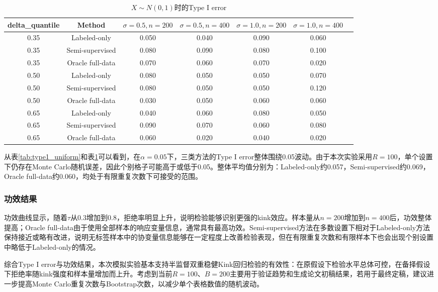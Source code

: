 \documentclass[12pt,a4paper]{ctexart}
\begin{document}
\begin{table}[htbp]
\centering
\caption{$X \sim N(0, 1)$时的Type I error}
\label{tab:type1_normal}
\small
\begin{tabular}{ccccccc}
\toprule
delta\_quantile & Method & $\sigma=0.5, n=200$ & $\sigma=0.5, n=400$ & $\sigma=1.0, n=200$ & $\sigma=1.0, n=400$ \\
\midrule
0.35 & Labeled-only & 0.050 & 0.040 & 0.090 & 0.060 \\
0.35 & Semi-supervised & 0.080 & 0.090 & 0.080 & 0.100 \\
0.35 & Oracle full-data & 0.070 & 0.060 & 0.070 & 0.020 \\
\midrule
0.50 & Labeled-only & 0.080 & 0.050 & 0.050 & 0.070 \\
0.50 & Semi-supervised & 0.080 & 0.050 & 0.050 & 0.120 \\
0.50 & Oracle full-data & 0.030 & 0.050 & 0.060 & 0.060 \\
\midrule
0.65 & Labeled-only & 0.040 & 0.060 & 0.080 & 0.050 \\
0.65 & Semi-supervised & 0.090 & 0.070 & 0.060 & 0.080 \\
0.65 & Oracle full-data & 0.060 & 0.020 & 0.040 & 0.020 \\
\bottomrule
\end{tabular}
\end{table}

从表\ref{tab:type1_uniform}和表\ref{tab:type1_normal}可以看到，在$\alpha=0.05$下，三类方法的Type I error整体围绕0.05波动。由于本次实验采用$R=100$，单个设置下仍存在Monte Carlo随机误差，因此个别格子可能高于或低于0.05。整体平均值分别为：Labeled-only约0.057，Semi-supervised约0.069，Oracle full-data约0.060，均处于有限重复次数下可接受的范围。

\subsubsection{功效结果}

功效曲线显示，随着$\tau$从0.3增加到0.8，拒绝率明显上升，说明检验能够识别更强的kink效应。样本量从$n=200$增加到$n=400$后，功效整体提高；Oracle full-data由于使用全部样本的响应变量信息，通常具有最高功效。Semi-supervised方法在多数设置下相对于Labeled-only方法保持接近或略有改进，说明无标签样本中的协变量信息能够在一定程度上改善检验表现，但在有限重复次数和有限样本下也会出现个别设置中略低于Labeled-only的情况。

综合Type I error与功效结果，本次模拟实验基本支持半监督双重稳健Kink回归检验的有效性：在原假设下检验水平总体可控，在备择假设下拒绝率随kink强度和样本量增加而上升。考虑到当前$R=100$、$B=200$主要用于验证趋势和生成论文初稿结果，若用于最终定稿，建议进一步提高Monte Carlo重复次数与Bootstrap次数，以减少单个表格数值的随机波动。
\end{document}
